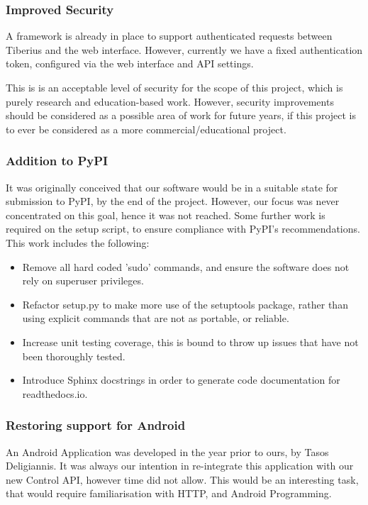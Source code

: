 \subsubsection{Improved Security}
A framework is already in place to support authenticated requests between
Tiberius and the web interface. However, currently we have a fixed
authentication token, configured via the web interface and API settings.

This is is an acceptable level of security for the scope of this project, which
is purely research and education-based work. However, security improvements
should be considered as a possible area of work for future years, if this
project is to ever be considered as a more commercial/educational project.

\subsubsection{Addition to PyPI}
It was originally conceived that our software would be in a suitable state for submission to \gls{PyPI}, by the end of the project. However, our focus was never concentrated on this goal, hence it was not reached. Some further work is required on the setup script, to ensure compliance with \gls{PyPI}'s recommendations.
This work includes the following:
\begin{itemize}
\item Remove all hard coded 'sudo' commands, and ensure the software does not rely on superuser privileges.
\item Refactor setup.py to make more use of the setuptools package, rather than using explicit commands that are not as portable, or reliable.
\item Increase unit testing coverage, this is bound to throw up issues that have not been thoroughly tested.
\item Introduce Sphinx docstrings in order to generate code documentation for readthedocs.io.
\end{itemize}

\subsubsection{Restoring support for Android}
An Android Application was developed in the year prior to ours, by Tasos Deligiannis. It was always our intention in re-integrate this application with our new Control API, however time did not allow. This would be an interesting task, that would require familiarisation with HTTP, and Android Programming.

